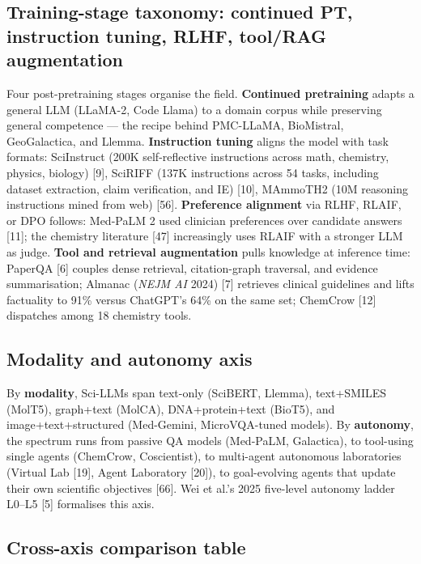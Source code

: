 \subsection{Training-stage taxonomy: continued PT, instruction tuning, RLHF, tool/RAG augmentation}\label{training-stage-taxonomy-continued-pt-instruction-tuning-rlhf-toolrag-augmentation}

Four post-pretraining stages organise the field. \textbf{Continued pretraining} adapts a general LLM (LLaMA-2, Code Llama) to a domain corpus while preserving general competence --- the recipe behind PMC-LLaMA, BioMistral, GeoGalactica, and Llemma. \textbf{Instruction tuning} aligns the model with task formats: SciInstruct (200K self-reflective instructions across math, chemistry, physics, biology) {[}9{]}, SciRIFF (137K instructions across 54 tasks, including dataset extraction, claim verification, and IE) {[}10{]}, MAmmoTH2 (10M reasoning instructions mined from web) {[}56{]}. \textbf{Preference alignment} via RLHF, RLAIF, or DPO follows: Med-PaLM 2 used clinician preferences over candidate answers {[}11{]}; the chemistry literature {[}47{]} increasingly uses RLAIF with a stronger LLM as judge. \textbf{Tool and retrieval augmentation} pulls knowledge at inference time: PaperQA {[}6{]} couples dense retrieval, citation-graph traversal, and evidence summarisation; Almanac (\emph{NEJM AI} 2024) {[}7{]} retrieves clinical guidelines and lifts factuality to 91\% versus ChatGPT's 64\% on the same set; ChemCrow {[}12{]} dispatches among 18 chemistry tools.

\subsection{Modality and autonomy axis}\label{modality-and-autonomy-axis}

By \textbf{modality}, Sci-LLMs span text-only (SciBERT, Llemma), text+SMILES (MolT5), graph+text (MolCA), DNA+protein+text (BioT5), and image+text+structured (Med-Gemini, MicroVQA-tuned models). By \textbf{autonomy}, the spectrum runs from passive QA models (Med-PaLM, Galactica), to tool-using single agents (ChemCrow, Coscientist), to multi-agent autonomous laboratories (Virtual Lab {[}19{]}, Agent Laboratory {[}20{]}), to goal-evolving agents that update their own scientific objectives {[}66{]}. Wei et al.'s 2025 five-level autonomy ladder L0--L5 {[}5{]} formalises this axis.

\subsection{Cross-axis comparison table}\label{cross-axis-comparison-table}

